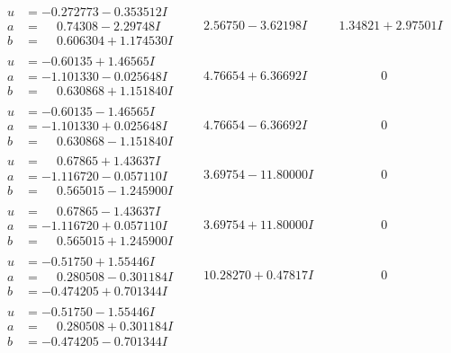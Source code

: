 \documentclass[1p]{elsarticle_modified}
\theoremstyle{definition}
\begin{document}
$$\begin{array}{c|c|c}
\begin{aligned}
u &= -0.272773 - 0.353512 I \\
a &= \phantom{-}0.74308 - 2.29748 I \\
b &= \phantom{-}0.606304 + 1.174530 I\end{aligned}
 & \phantom{-}2.56750 - 3.62198 I & \phantom{-}1.34821 + 2.97501 I \\ \hline\begin{aligned}
u &= -0.60135 + 1.46565 I \\
a &= -1.101330 - 0.025648 I \\
b &= \phantom{-}0.630868 + 1.151840 I\end{aligned}
 & \phantom{-}4.76654 + 6.36692 I & \phantom{-0.000000 } 0 \\ \hline\begin{aligned}
u &= -0.60135 - 1.46565 I \\
a &= -1.101330 + 0.025648 I \\
b &= \phantom{-}0.630868 - 1.151840 I\end{aligned}
 & \phantom{-}4.76654 - 6.36692 I & \phantom{-0.000000 } 0 \\ \hline\begin{aligned}
u &= \phantom{-}0.67865 + 1.43637 I \\
a &= -1.116720 - 0.057110 I \\
b &= \phantom{-}0.565015 - 1.245900 I\end{aligned}
 & \phantom{-}3.69754 - 11.80000 I & \phantom{-0.000000 } 0 \\ \hline\begin{aligned}
u &= \phantom{-}0.67865 - 1.43637 I \\
a &= -1.116720 + 0.057110 I \\
b &= \phantom{-}0.565015 + 1.245900 I\end{aligned}
 & \phantom{-}3.69754 + 11.80000 I & \phantom{-0.000000 } 0 \\ \hline\begin{aligned}
u &= -0.51750 + 1.55446 I \\
a &= \phantom{-}0.280508 - 0.301184 I \\
b &= -0.474205 + 0.701344 I\end{aligned}
 & \phantom{-}10.28270 + 0.47817 I & \phantom{-0.000000 } 0 \\ \hline\begin{aligned}
u &= -0.51750 - 1.55446 I \\
a &= \phantom{-}0.280508 + 0.301184 I \\
b &= -0.474205 - 0.701344 I\end{aligned}

\end{array}$$
\end{document}
